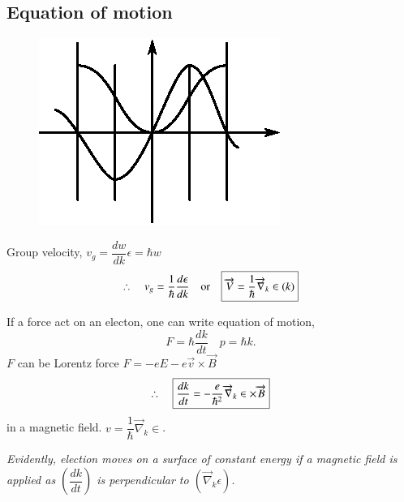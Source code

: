 \chapter[Lecture 23]{}\label{lec23}

\section*{Equation of motion}
\begin{figure}[H]
\centering
\includegraphics{images/lecture23/fig4.eps}
\end{figure}
Group velocity, $v_{g}=\dfrac{dw}{dk}$\quad $\epsilon=\hbar w$
$$
\therefore\quad v_{g}=\dfrac{1}{\hbar}\dfrac{d\epsilon}{dk}\quad \text{or}\quad \fbox{$\overrightarrow{V}=\dfrac{1}{\hbar}\overrightarrow{\nabla}_{k}\in (k)$}
$$

If a force act on an electon, one can write equation of motion,
$$
F=\hbar \dfrac{dk}{dt}\quad p=\hbar k.
$$
$F$ can be Lorentz force $F=-eE-e\overrightarrow{v}\times \overrightarrow{B}$
$$
\therefore\quad \fbox{$\dfrac{dk}{dt}=-\dfrac{e}{\hbar^{2}}\overrightarrow{\nabla}_{k}\in \times \overrightarrow{B}$}
$$
in a magnetic field. $v=\dfrac{1}{\hbar}\overrightarrow{\nabla}_{k}\in$.

{\em Evidently, election moves on a surface of constant energy if a magnetic field is applied as $\left(\dfrac{dk}{dt}\right)$ is perpendicular to $(\overrightarrow{\nabla}_{k}\epsilon)$}.

